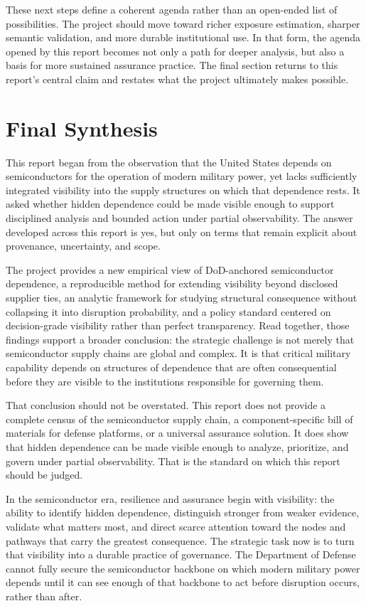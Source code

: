 These next steps define a coherent agenda rather than an open-ended list of possibilities. The project should move toward richer exposure estimation, sharper semantic validation, and more durable institutional use. In that form, the agenda opened by this report becomes not only a path for deeper analysis, but also a basis for more sustained assurance practice. The final section returns to this report's central claim and restates what the project ultimately makes possible.

\section{Final Synthesis}
\label{sec:ch6_final_synthesis}

This report began from the observation that the United States depends on semiconductors for the operation of modern military power, yet lacks sufficiently integrated visibility into the supply structures on which that dependence rests. It asked whether hidden dependence could be made visible enough to support disciplined analysis and bounded action under partial observability. The answer developed across this report is yes, but only on terms that remain explicit about provenance, uncertainty, and scope.

The project provides a new empirical view of DoD-anchored semiconductor dependence, a reproducible method for extending visibility beyond disclosed supplier ties, an analytic framework for studying structural consequence without collapsing it into disruption probability, and a policy standard centered on decision-grade visibility rather than perfect transparency. Read together, those findings support a broader conclusion: the strategic challenge is not merely that semiconductor supply chains are global and complex. It is that critical military capability depends on structures of dependence that are often consequential before they are visible to the institutions responsible for governing them.

That conclusion should not be overstated. This report does not provide a complete census of the semiconductor supply chain, a component-specific bill of materials for defense platforms, or a universal assurance solution. It does show that hidden dependence can be made visible enough to analyze, prioritize, and govern under partial observability. That is the standard on which this report should be judged.

In the semiconductor era, resilience and assurance begin with visibility: the ability to identify hidden dependence, distinguish stronger from weaker evidence, validate what matters most, and direct scarce attention toward the nodes and pathways that carry the greatest consequence. The strategic task now is to turn that visibility into a durable practice of governance. The Department of Defense cannot fully secure the semiconductor backbone on which modern military power depends until it can see enough of that backbone to act before disruption occurs, rather than after.
